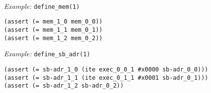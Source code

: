 ~\\
\noindent
\emph{Example:} \lstinline[style=c++]{define_mem(1)}

\begin{lstlisting}[language=smtlib]
(assert (= mem_1_0 mem_0_0))
(assert (= mem_1_1 mem_0_1))
(assert (= mem_1_2 mem_0_2))
\end{lstlisting}



\newpage

\noindent
\emph{Example:} \lstinline[style=c++]{define_sb_adr(1)}

\begin{lstlisting}[language=smtlib]
(assert (= sb-adr_1_0 (ite exec_0_0_1 #x0000 sb-adr_0_0)))
(assert (= sb-adr_1_1 (ite exec_0_1_1 #x0001 sb-adr_0_1)))
(assert (= sb-adr_1_2 sb-adr_0_2))
\end{lstlisting}



